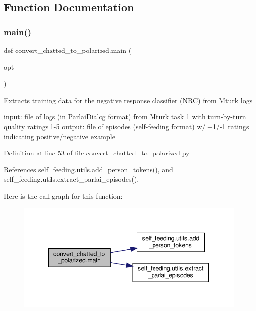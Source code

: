 \subsection{Function Documentation}
\mbox{\label{namespaceconvert__chatted__to__polarized_aadba9ee59fc962ba83f4c31a22d4c28d}} 
\subsubsection{\texorpdfstring{main()}{main()}}
{\footnotesize\ttfamily def convert\+\_\+chatted\+\_\+to\+\_\+polarized.\+main (\begin{DoxyParamCaption}\item[{}]{opt }\end{DoxyParamCaption})}

\begin{DoxyVerb}Extracts training data for the negative response classifier (NRC) from Mturk logs

input: file of logs (in ParlaiDialog format) from Mturk task 1 with turn-by-turn
    quality ratings 1-5
output: file of episodes (self-feeding format) w/ +1/-1 ratings indicating
    positive/negative example
\end{DoxyVerb}
 

Definition at line 53 of file convert\+\_\+chatted\+\_\+to\+\_\+polarized.\+py.



References self\+\_\+feeding.\+utils.\+add\+\_\+person\+\_\+tokens(), and self\+\_\+feeding.\+utils.\+extract\+\_\+parlai\+\_\+episodes().

Here is the call graph for this function\+:
\nopagebreak
\begin{figure}[H]
\begin{center}
\leavevmode
\includegraphics[width=339pt]{namespaceconvert__chatted__to__polarized_aadba9ee59fc962ba83f4c31a22d4c28d_cgraph}
\end{center}
\end{figure}
\mbox{\label{namespaceconvert__chatted__to__polarized_a1318d32a7ea5fa636f9e29e8e92b2833}} 
